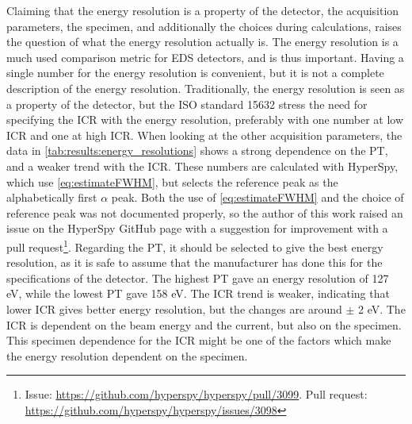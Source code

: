 

Claiming that the energy resolution is a property of the detector, the acquisition parameters, the specimen, and additionally the choices during calculations, raises the question of what the energy resolution actually is.
The energy resolution is a much used comparison metric for EDS detectors, and is thus important.
Having a single number for the energy resolution is convenient, but it is not a complete description of the energy resolution.
Traditionally, the energy resolution is seen as a property of the detector, but the ISO standard 15632 \cite{iso_qc_15632} stress the need for specifying the ICR with the energy resolution, preferably with one number at low ICR and one at high ICR.
When looking at the other acquisition parameters, the data in \cref{tab:results:energy_resolutions} shows a strong dependence on the PT, and a weaker trend with the ICR.
These numbers are calculated with HyperSpy, which use \cref{eq:estimateFWHM}, but selects the reference peak as the alphabetically first $\alpha$ peak.
Both the use of \cref{eq:estimateFWHM} and the choice of reference peak was not documented properly, so the author of this work raised an issue on the HyperSpy GitHub page with a suggestion for improvement with a pull request\footnote{Issue: \url{https://github.com/hyperspy/hyperspy/pull/3099}. Pull request: \url{https://github.com/hyperspy/hyperspy/issues/3098}}.
Regarding the PT, it should be selected to give the best energy resolution, as it is safe to assume that the manufacturer has done this for the specifications of the detector.
The highest PT gave an energy resolution of 127 eV, while the lowest PT gave 158 eV.
The ICR trend is weaker, indicating that lower ICR gives better energy resolution, but the changes are around $\pm$ 2 eV.
The ICR is dependent on the beam energy and the current, but also on the specimen.
This specimen dependence for the ICR might be one of the factors which make the energy resolution dependent on the specimen.
